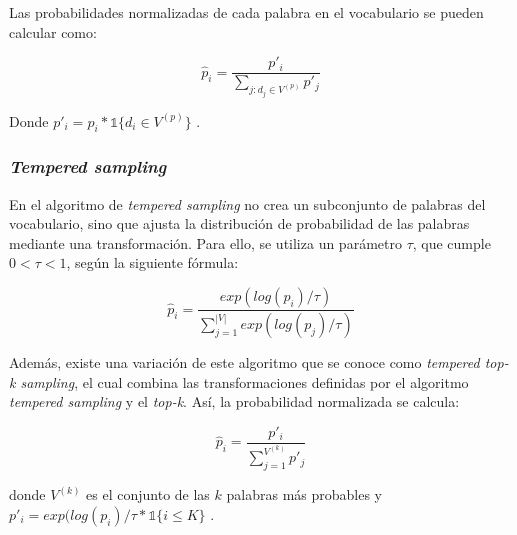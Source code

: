\documentclass[11pt,spanish,listoffigures,listoftables]{tfgetsinf}
\begin{document}
Las probabilidades normalizadas de cada palabra en el vocabulario se pueden calcular como:

\begin{equation}
\hat{p}_i = \frac{p'_i}{\sum_{j:d_j \in V^{(p)}} p'_j}
\end{equation}

Donde $p'_i = p_i * \mathbb{1}\{ d_i \in V^{(p)} \}$ \cite{nadeem2020systematiccharacterizationsamplingalgorithms}.

\subsubsection{\textit{Tempered sampling}}

En el algoritmo de \textit{tempered sampling} \cite{nadeem2020systematiccharacterizationsamplingalgorithms} no crea un subconjunto de palabras del vocabulario, sino que ajusta la distribución de probabilidad de las palabras mediante una transformación. Para ello, se utiliza un parámetro $\tau$, que cumple $0 < \tau < 1$, según la siguiente fórmula:

\begin{equation}
\hat{p}_i = \frac{exp(log(p_i)/\tau)}{\sum_{j = 1}^{|V|}exp(log(p_j)/\tau)}
\end{equation}

Además, existe una variación de este algoritmo que se conoce como \textit{tempered top-k sampling}, el cual combina las transformaciones definidas por el algoritmo \textit{tempered sampling} y el \textit{top-k}. Así, la probabilidad normalizada se calcula:

\begin{equation}
\hat{p}_i = \frac{p'_i}{\sum_{j = 1}^{V^{(k)}}p'_j}
\end{equation}

donde $V^{(k)}$ es el conjunto de las $k$ palabras más probables y $p'_i = exp(log(p_i)/\tau * \mathbb{1}\{i \leq K\}$ .



\end{document}
